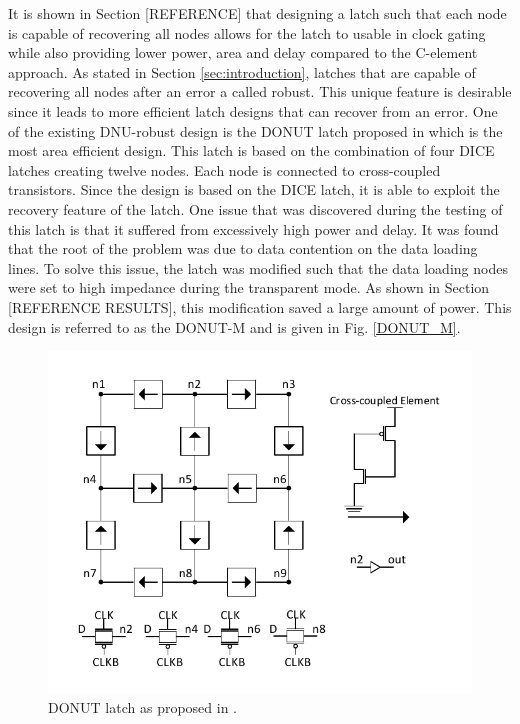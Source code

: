 It is shown in Section [REFERENCE] that designing a latch such that each node is capable of recovering all nodes allows for the latch to usable in clock gating while also providing lower power, area and delay compared to the C-element approach. As stated in Section \ref{sec:introduction}, latches that are capable of recovering all nodes after an error a called robust. This unique feature is desirable since it leads to more efficient latch designs that can recover from an error. One of the existing DNU-robust design is the DONUT latch proposed in \cite{DONUT} which is the most area efficient design. This latch is based on the combination of four DICE latches creating twelve nodes. Each node is connected to cross-coupled transistors. Since the design is based on the DICE latch, it is able to exploit the recovery feature of the latch. One issue that was discovered during the testing of this latch is that it suffered from excessively high power and delay. It was found that the root of the problem was due to data contention on the data loading lines. To solve this issue, the latch was modified such that the data loading nodes were set to high impedance during the transparent mode. As shown in Section [REFERENCE RESULTS], this modification saved a large amount of power. This design is referred to as the DONUT-M and is given in Fig. \ref{DONUT_M}.

\begin{figure}[!htbp]
	\centering
	\includegraphics[width=\linewidth]{Figures/DONUT}
	\caption{DONUT latch as proposed in \cite{DONUT}.}
	\label{fig:DONUT}
\end{figure}

